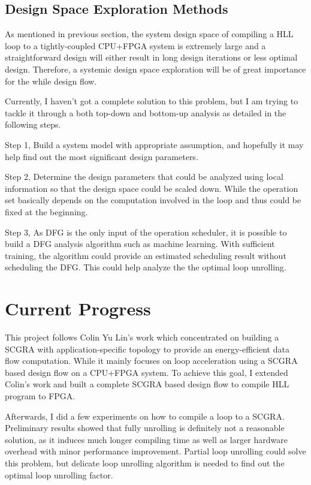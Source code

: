 \documentclass[12pt]{article} %
\begin{document}
\subsection{Design Space Exploration Methods}
As mentioned in previous section, the system design space of compiling a HLL loop to a
tightly-coupled CPU+FPGA system is extremely large and a straightforward design 
will either result in long design iterations or less optimal design. Therefore, 
a systemic design space exploration will be of great importance for the
while design flow. 

Currently, I haven't got a complete solution to this problem, but I am trying to tackle it through a
both top-down and bottom-up analysis as detailed in the following steps. 

Step 1, Build a system model with appropriate assumption, and hopefully it may help find out the
most significant design parameters.

Step 2, Determine the design parameters that could be analyzed using local information so that the
design space could be scaled down. While the operation set basically depends on the computation 
involved in the loop and thus could be fixed at the beginning. 

Step 3, As DFG is the only input of the operation scheduler, it is possible to build a DFG analysis
algorithm such as machine learning. With sufficient training, the algorithm could provide an
estimated scheduling result without scheduling the DFG. This could help analyze the the optimal loop
unrolling.

\section{Current Progress}
This project follows Colin Yu Lin's work \cite{colinheart} which concentrated on building a SCGRA
with application-specific topology to provide an energy-efficient data flow computation. While it mainly
focuses on loop acceleration using a SCGRA based design flow on a CPU+FPGA system. To achieve this goal, 
I extended Colin's work and built a complete SCGRA based design flow to compile HLL program to 
FPGA. 

Afterwards, I did a few experiments on how to compile a loop to a SCGRA. Preliminary results
showed that fully unrolling is definitely not a reasonable solution, as it induces much longer compiling
time as well as larger hardware overhead with minor performance improvement. Partial loop
unrolling could solve this problem, but delicate loop unrolling algorithm is needed to find out the
optimal loop unrolling factor. 
\end{document}
